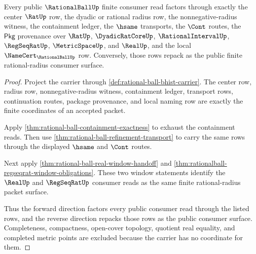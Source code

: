 \begin{theorem}
\label{thm:rational-ball-public-finite-consumer-export}
Every public $\RationalBallUp$ finite consumer read factors through exactly the
center $\RatUp$ row, the dyadic or rational radius row, the
nonnegative-radius witness, the containment ledger, the $\hsame$ transports,
the $\Cont$ routes, the $\mathsf{Pkg}$ provenance over $\RatUp$,
$\DyadicRatCoreUp$, $\RationalIntervalUp$, $\RegSeqRatUp$, $\MetricSpaceUp$,
and $\RealUp$, and the local $\NameCert_{\RationalBallUp}$ row. Conversely,
those rows repack as the public finite rational-radius consumer surface.
\end{theorem}
\begin{proof}
Project the carrier through \autoref{def:rational-ball-bhist-carrier}. The
center row, radius row, nonnegative-radius witness, containment ledger,
transport rows, continuation routes, package provenance, and local naming row
are exactly the finite coordinates of an accepted packet.

Apply \autoref{thm:rational-ball-containment-exactness} to exhaust the
containment reads. Then use
\autoref{thm:rational-ball-refinement-transport} to carry the same rows through
the displayed $\hsame$ and $\Cont$ routes.

Next apply \autoref{thm:rational-ball-real-window-handoff} and
\autoref{thm:rationalball-regseqrat-window-obligations}. These two window
statements identify the $\RealUp$ and $\RegSeqRatUp$ consumer reads as the same
finite rational-radius packet surface.

Thus the forward direction factors every public consumer read through the
listed rows, and the reverse direction repacks those rows as the public
consumer surface. Completeness, compactness, open-cover topology, quotient real
equality, and completed metric points are excluded because the carrier has no
coordinate for them.
\end{proof}

